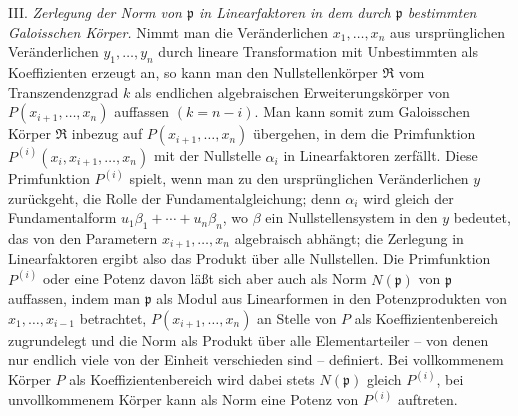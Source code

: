 \documentclass[11pt]{article}
\begin{document}
III. \emph{Zerlegung der Norm von $\mathfrak p$ in Linearfaktoren in dem durch $\mathfrak p$ bestimmten Galoisschen Körper.} Nimmt man die Veränderlichen $x_1,\ldots,x_n$ aus ursprünglichen Veränderlichen $y_1,\ldots,y_n$ durch lineare Transformation mit Unbestimmten als Koeffizienten erzeugt an, so kann man den Nullstellenkörper $\mathfrak R$ vom Transzendenzgrad $k$ als endlichen algebraischen Erweiterungskörper von $P(x_{i+1},\ldots,x_n)$ auffassen $(k=n-i)$. Man kann somit zum Galoisschen Körper $\mathfrak R$ inbezug auf $P(x_{i+1},\ldots,x_n)$ übergehen, in dem die Primfunktion $P^{(i)}(x_i,x_{i+1},\ldots,x_n)$ mit der Nullstelle $\alpha_i$ in Linearfaktoren zerfällt. Diese Primfunktion $P^{(i)}$ spielt, wenn man zu den ursprünglichen Veränderlichen $y$ zurückgeht, die Rolle der Fundamentalgleichung; denn $\alpha_i$ wird gleich der Fundamentalform $u_1\beta_1+\cdots+u_n\beta_n$, wo $\beta$ ein Nullstellensystem in den $y$ bedeutet, das von den Parametern $x_{i+1},\ldots,x_n$ algebraisch abhängt; die Zerlegung in Linearfaktoren ergibt also das Produkt über alle Nullstellen. Die Primfunktion $P^{(i)}$ oder eine Potenz davon läßt sich aber auch als Norm $N(\mathfrak p)$ von $\mathfrak p$ auffassen, indem man $\mathfrak p$ als Modul aus Linearformen in den Potenzprodukten von $x_1,\ldots,x_{i-1}$ betrachtet, $P(x_{i+1},\ldots,x_n)$ an Stelle von $P$ als Koeffizientenbereich zugrundelegt und die Norm als Produkt über alle Elementarteiler -- von denen nur endlich viele von der Einheit verschieden sind -- definiert. Bei vollkommenem Körper $P$ als Koeffizientenbereich wird dabei stets $N(\mathfrak p)$ gleich $P^{(i)}$, bei unvollkommenem Körper kann als Norm eine Potenz von $P^{(i)}$ auftreten.
\end{document}
